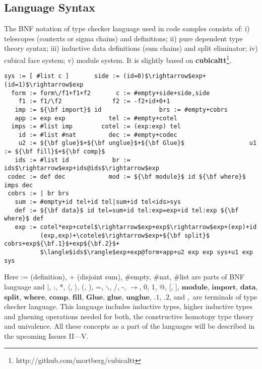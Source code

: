 \documentclass{article}
\theoremstyle{definition}
\begin{document}
\subsection*{Language Syntax}

The BNF notation of type checker language used in code samples consists of:
i) telescopes (contexts or sigma chains) and definitions;
ii) pure dependent type theory syntax;
iii) inductive data definitions (sum chains) and split eliminator;
iv) cubical face system;
v) module system. It is slightly based on
{\bf cubicaltt}\footnote{http://github.com/mortberg/cubicaltt}.

\begin{lstlisting}[mathescape=true]
   sys := [ #list c ]       side := (id=0)$\rightarrow$exp+(id=1)$\rightarrow$exp
  form := form\/f1+f1+f2       c := #empty+side+side,side
    f1 := f1/\f2              f2 := -f2+id+0+1
   imp := ${\bf import}$ id                brs := #empty+cobrs
   app := exp exp            tel := #empty+cotel
  imps := #list imp        cotel := (exp:exp) tel
    id := #list #nat         dec := #empty+codec
    u2 := ${\bf glue}$+${\bf unglue}$+${\bf Glue}$                  u1 := ${\bf fill}$+${\bf comp}$
   ids := #list id            br := ids$\rightarrow$exp+ids@ids$\rightarrow$exp
 codec := def dec            mod := ${\bf module}$ id ${\bf where}$ imps dec
 cobrs := | br brs
   sum := #empty+id tel+id tel|sum+id tel<ids>sys   
   def := ${\bf data}$ id tel=sum+id tel:exp=exp+id tel:exp ${\bf where}$ def
   exp := cotel*exp+cotel$\rightarrow$exp+exp$\rightarrow$exp+(exp)+id
          (exp,exp)+\cotele$\rightarrow$exp+${\bf split}$ cobrs+exp${\bf.1}$+exp${\bf.2}$+
          $\langle$ids$\rangle$exp+exp@form+app+u2 exp exp sys+u1 exp sys
\end{lstlisting}

Here := (definition), + (disjoint sum), \#empty, \#nat, \#list are parts of BNF language and
$\rvert$, :, *, $\langle$, $\rangle$, (, ), =, $\backslash$, /, -, $\rightarrow$, 0, 1, @, [, ],
$\mathbf{module}$, $\mathbf{import}$,
$\mathbf{data}$, $\mathbf{split}$, $\mathbf{where}$, $\mathbf{comp}$, $\mathbf{fill}$,
$\mathbf{Glue}$, $\mathbf{glue}$, $\mathbf{unglue}$,
$\mathbf{.1}$, $\mathbf{.2}$,
 and $,$ are terminals of type checker language. This language includes
inductive types, higher inductive types and gluening operations needed for
both, the constructive homotopy type theory and univalence. All these concepts as a part of the languages
will be described in the upcoming Issues II---V.

\newpage
\end{document}
